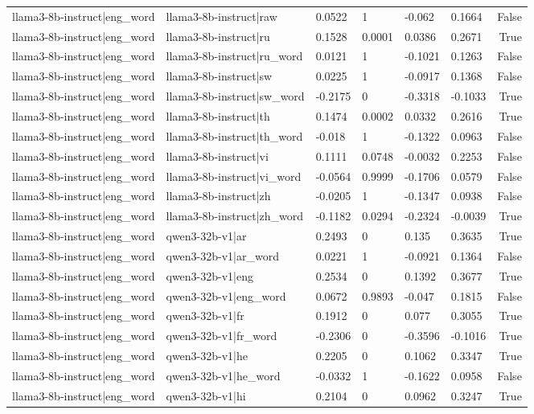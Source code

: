 \begin{table}
\begin{tabular}{llllllr}
llama3-8b-instruct|eng_word & llama3-8b-instruct|raw & 0.0522 & 1 & -0.062 & 0.1664 & False \\
llama3-8b-instruct|eng_word & llama3-8b-instruct|ru & 0.1528 & 0.0001 & 0.0386 & 0.2671 & True \\
llama3-8b-instruct|eng_word & llama3-8b-instruct|ru_word & 0.0121 & 1 & -0.1021 & 0.1263 & False \\
llama3-8b-instruct|eng_word & llama3-8b-instruct|sw & 0.0225 & 1 & -0.0917 & 0.1368 & False \\
llama3-8b-instruct|eng_word & llama3-8b-instruct|sw_word & -0.2175 & 0 & -0.3318 & -0.1033 & True \\
llama3-8b-instruct|eng_word & llama3-8b-instruct|th & 0.1474 & 0.0002 & 0.0332 & 0.2616 & True \\
llama3-8b-instruct|eng_word & llama3-8b-instruct|th_word & -0.018 & 1 & -0.1322 & 0.0963 & False \\
llama3-8b-instruct|eng_word & llama3-8b-instruct|vi & 0.1111 & 0.0748 & -0.0032 & 0.2253 & False \\
llama3-8b-instruct|eng_word & llama3-8b-instruct|vi_word & -0.0564 & 0.9999 & -0.1706 & 0.0579 & False \\
llama3-8b-instruct|eng_word & llama3-8b-instruct|zh & -0.0205 & 1 & -0.1347 & 0.0938 & False \\
llama3-8b-instruct|eng_word & llama3-8b-instruct|zh_word & -0.1182 & 0.0294 & -0.2324 & -0.0039 & True \\
llama3-8b-instruct|eng_word & qwen3-32b-v1|ar & 0.2493 & 0 & 0.135 & 0.3635 & True \\
llama3-8b-instruct|eng_word & qwen3-32b-v1|ar_word & 0.0221 & 1 & -0.0921 & 0.1364 & False \\
llama3-8b-instruct|eng_word & qwen3-32b-v1|eng & 0.2534 & 0 & 0.1392 & 0.3677 & True \\
llama3-8b-instruct|eng_word & qwen3-32b-v1|eng_word & 0.0672 & 0.9893 & -0.047 & 0.1815 & False \\
llama3-8b-instruct|eng_word & qwen3-32b-v1|fr & 0.1912 & 0 & 0.077 & 0.3055 & True \\
llama3-8b-instruct|eng_word & qwen3-32b-v1|fr_word & -0.2306 & 0 & -0.3596 & -0.1016 & True \\
llama3-8b-instruct|eng_word & qwen3-32b-v1|he & 0.2205 & 0 & 0.1062 & 0.3347 & True \\
llama3-8b-instruct|eng_word & qwen3-32b-v1|he_word & -0.0332 & 1 & -0.1622 & 0.0958 & False \\
llama3-8b-instruct|eng_word & qwen3-32b-v1|hi & 0.2104 & 0 & 0.0962 & 0.3247 & True \\

\end{tabular}
\end{table}
